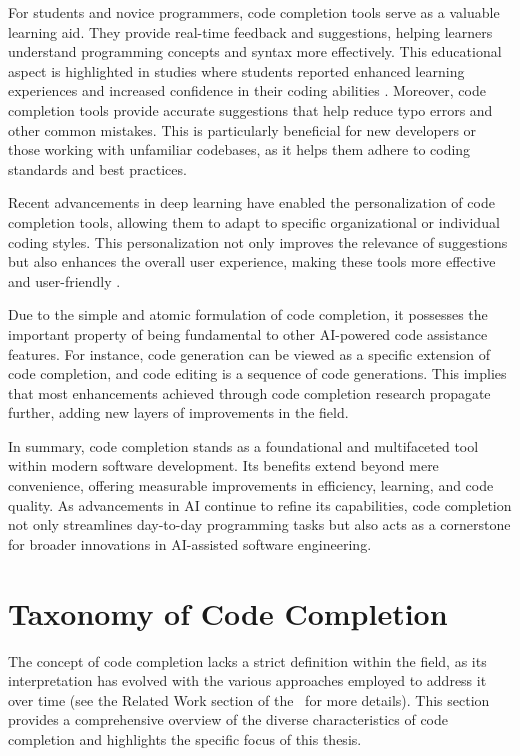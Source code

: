 For students and novice programmers, code completion tools serve as a valuable learning aid. They provide real-time feedback and suggestions, helping learners understand programming concepts and syntax more effectively. This educational aspect is highlighted in studies where students reported enhanced learning experiences and increased confidence in their coding abilities \parencite{takerngsaksiri2023}. Moreover, code completion tools provide accurate suggestions that help reduce typo errors and other common mistakes. This is particularly beneficial for new developers or those working with unfamiliar codebases, as it helps them adhere to coding standards and best practices.

Recent advancements in deep learning have enabled the personalization of code completion tools, allowing them to adapt to specific organizational or individual coding styles. This personalization not only improves the relevance of suggestions but also enhances the overall user experience, making these tools more effective and user-friendly \parencite{giagnorio2025}.

Due to the simple and atomic formulation of code completion, it possesses the important property of being fundamental to other AI-powered code assistance features. For instance, code generation can be viewed as a specific extension of code completion, and code editing is a sequence of code generations. This implies that most enhancements achieved through code completion research propagate further, adding new layers of improvements in the field.

In summary, code completion stands as a foundational and multifaceted tool within modern software development. Its benefits extend beyond mere convenience, offering measurable improvements in efficiency, learning, and code quality. As advancements in AI continue to refine its capabilities, code completion not only streamlines day-to-day programming tasks but also acts as a cornerstone for broader innovations in AI-assisted software engineering.

\section{Taxonomy of Code Completion}

The concept of code completion lacks a strict definition within the field, as its interpretation has evolved with the various approaches employed to address it over time (see the Related Work section of the~\citet{ciniselli2021} for more details). This section provides a comprehensive overview of the diverse characteristics of code completion and highlights the specific focus of this thesis.

